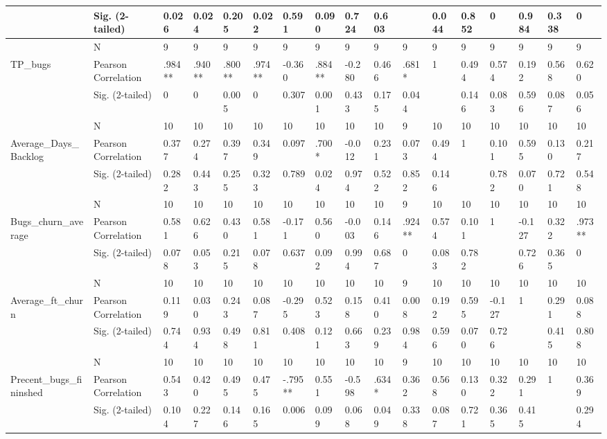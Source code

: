\documentclass[UKenglish]{ifimaster}  %
\begin{document}
\begin{table}[htbp]
\begin{adjustwidth}{-2cm}{}
{\begin{tabular}{ | l | l | l | l | l | l | l | l | l | l | l | l | l | l | l | l | l | }
	 & Sig. (2-tailed) & 0.026 & 0.024 & 0.205 & 0.022 & 0.591 & 0.090 & 0.724 & 0.603 &  & 0.044 & 0.852 & 0 & 0.984 & 0.338 & 0\\ \hline
	 & N & 9 & 9 & 9 & 9 & 9 & 9 & 9 & 9 & 9 & 9 & 9 & 9 & 9 & 9 & 9 \\ \hline
	TP\_bugs & Pearson Correlation & .984** & .940** & .800** & .974** & -0.360 & .884** & -0.280 & 0.466 & .681* & 1 & 0.494 & 0.574 & 0.192 & 0.568 & 0.620\\ \hline
	 & Sig. (2-tailed) & 0 & 0 & 0.005 & 0 & 0.307 & 0.001 & 0.433 & 0.175 & 0.044 &  & 0.146 & 0.083 & 0.596 & 0.087 & 0.056\\ \hline
	 & N & 10 & 10 & 10 & 10 & 10 & 10 & 10 & 10 & 9 & 10 & 10 & 10 & 10 & 10 & 10 \\ \hline
	Average\_Days\_Backlog & Pearson Correlation & 0.377 & 0.274 & 0.397 & 0.349 & 0.097 & .700* & -0.012 & 0.231 & 0.073 & 0.494 & 1 & 0.101 & 0.595 & 0.130 & 0.217\\ \hline
	 & Sig. (2-tailed) & 0.282 & 0.443 & 0.255 & 0.323 & 0.789 & 0.024 & 0.974 & 0.522 & 0.852 & 0.146 &  & 0.782 & 0.070 & 0.721 & 0.548\\ \hline
	 & N & 10 & 10 & 10 & 10 & 10 & 10 & 10 & 10 & 9 & 10 & 10 & 10 & 10 & 10 & 10 \\ \hline
	Bugs\_churn\_average & Pearson Correlation & 0.581 & 0.626 & 0.430 & 0.581 & -0.171 & 0.560 & -0.003 & 0.146 & .924** & 0.574 & 0.101 & 1 & -0.127 & 0.322 & .973** \\ \hline
	 & Sig. (2-tailed) & 0.078 & 0.053 & 0.215 & 0.078 & 0.637 & 0.092 & 0.994 & 0.687 & 0 & 0.083 & 0.782 &  & 0.726 & 0.365 & 0\\ \hline
	 & N & 10 & 10 & 10 & 10 & 10 & 10 & 10 & 10 & 9 & 10 & 10 & 10 & 10 & 10 & 10 \\ \hline
	Average\_ft\_churn & Pearson Correlation & 0.119 & 0.030 & 0.243 & 0.087 & -0.295 & 0.523 & 0.158 & 0.410 & 0.008 & 0.192 & 0.595 & -0.127 & 1 & 0.291 & 0.088\\ \hline
	 & Sig. (2-tailed) & 0.744 & 0.934 & 0.498 & 0.811 & 0.408 & 0.121 & 0.663 & 0.239 & 0.984 & 0.596 & 0.070 & 0.726 &  & 0.415 & 0.808\\ \hline
	 & N & 10 & 10 & 10 & 10 & 10 & 10 & 10 & 10 & 9 & 10 & 10 & 10 & 10 & 10 & 10 \\ \hline
	Precent\_bugs\_fininshed & Pearson Correlation & 0.543 & 0.420 & 0.495 & 0.475 & -.795** & 0.551 & -0.598 & .634* & 0.362 & 0.568 & 0.130 & 0.322 & 0.291 & 1 & 0.369\\ \hline
	 & Sig. (2-tailed) & 0.104 & 0.227 & 0.146 & 0.165 & 0.006 & 0.099 & 0.068 & 0.049 & 0.338 & 0.087 & 0.721 & 0.365 & 0.415 &  & 0.294\\ \hline

\end{tabular}}
\end{adjustwidth}
\end{table}
\end{document}
